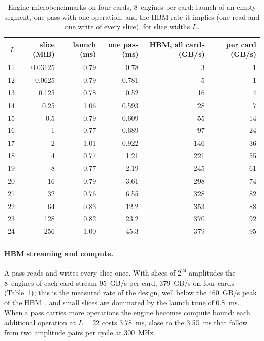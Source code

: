 \documentclass[pdflatex,sn-mathphys-num]{sn-jnl}
\newcommand{\NumClockFlagship}{300}
\newcommand{\NumEnginesFlagship}{8}
\newcommand{\NumHbmAllCards}{379}
\newcommand{\NumHbmLmax}{24}
\newcommand{\NumHbmPerCard}{95}
\newcommand{\NumLaunchMs}{0.8}
\newcommand{\NumOpCostModelMs}{3.50}
\newcommand{\NumOpCostMs}{3.78}
\newcommand{\NumPassmL}{22}
\theoremstyle{thmstyleone}
\theoremstyle{thmstylethree}
\begin{document}
\begin{table}[t]
\caption{Engine microbenchmarks on four cards, \NumEnginesFlagship~engines per card: launch of an empty segment, one
pass with one operation, and the HBM rate it implies (one read and one write of every slice), for slice widths $L$.}\label{tab:micro}
\begin{tabular}{@{}rrrrrr@{}}
\toprule
$L$ & slice (MiB) & launch (ms) & one pass (ms) & HBM, all cards (GB/s) & per card (GB/s) \\
\midrule
11 & 0.03125 & 0.79 & 0.78 & 3 & 1 \\
12 & 0.0625 & 0.79 & 0.781 & 5 & 1 \\
13 & 0.125 & 0.78 & 0.52 & 16 & 4 \\
14 & 0.25 & 1.06 & 0.593 & 28 & 7 \\
15 & 0.5 & 0.79 & 0.609 & 55 & 14 \\
16 & 1 & 0.77 & 0.689 & 97 & 24 \\
17 & 2 & 1.01 & 0.922 & 146 & 36 \\
18 & 4 & 0.77 & 1.21 & 221 & 55 \\
19 & 8 & 0.77 & 2.19 & 245 & 61 \\
20 & 16 & 0.79 & 3.61 & 298 & 74 \\
21 & 32 & 0.76 & 6.55 & 328 & 82 \\
22 & 64 & 0.83 & 12.2 & 353 & 88 \\
23 & 128 & 0.82 & 23.2 & 370 & 92 \\
24 & 256 & 1.00 & 45.3 & 379 & 95 \\
\bottomrule
\end{tabular}
\end{table}

\paragraph{HBM streaming and compute.} A pass reads and writes every slice once. With slices of $2^{\NumHbmLmax}$
amplitudes the \NumEnginesFlagship~engines of each card stream \NumHbmPerCard~GB/s per card, \NumHbmAllCards~GB/s on four
cards (Table~\ref{tab:micro}); this is the measured rate of the design, well below the 460~GB/s peak of the
HBM~\cite{amd_ds978}, and small slices are dominated by the launch time of \NumLaunchMs~ms. When a pass carries more
operations the engine becomes compute bound: each additional operation at $L=\NumPassmL$ costs \NumOpCostMs~ms, close to
the \NumOpCostModelMs~ms that follow from two amplitude pairs per cycle at \NumClockFlagship~MHz.
\end{document}
